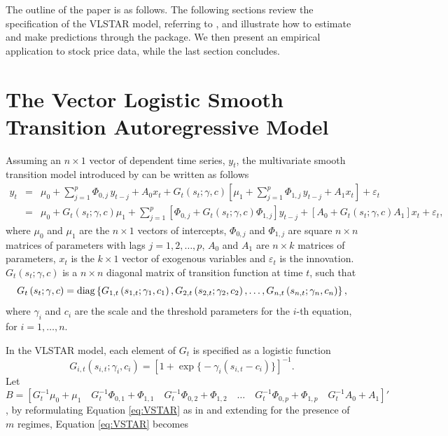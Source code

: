 The outline of the paper is as follows. The following sections review the specification of the VLSTAR model, referring to \citet*{teraya14}, and illustrate how to estimate and make predictions through the  package. We then present an empirical application to stock price data, while the last section concludes.


\section{The Vector Logistic Smooth Transition Autoregressive Model} 
\label{Section2}

Assuming an $n \times 1$ vector of dependent time series, $y_t$, the multivariate smooth transition model introduced by \citet*{teraya14} can be written as follows
\begin{eqnarray}
\label{eq:VSTAR}
y_t & = & \mu_0+\sum_{j=1}^{p}\Phi_{0,j}\,y_{t-j}+A_0 x_t+
G_t\left(s_t;\gamma,c\right)\left[\mu_{1}+\sum_{j=1}^{p}\Phi_{1,j}\,y_{t-j}+A_1x_t\right]+\varepsilon_t\nonumber\\
& = & \mu_{0}+G_t\left(s_t;\gamma,c\right)\mu_{1}+\sum_{j=1}^{p}\left[\Phi_{0,j}+G_t\left(s_t;\gamma,c\right)\Phi_{1,j}\right]y_{t-j}
+\left[A_0+G_t\left(s_t;\gamma,c\right)A_1\right]x_t+\varepsilon_t,
\end{eqnarray}
where $\mu_{0}$ and $\mu_{1}$ are the $n \times 1$ vectors of intercepts, $\Phi_{0,j}$ and $\Phi_{1,j}$ are square
$n\times n$ matrices of parameters with lags $j=1,2,\dots,p$, $A_0$ and $A_1$ are $n\times k$ matrices of parameters,
$x_t$ is the $k \times 1$ vector of exogenous variables and $\varepsilon_t$ is the innovation. $G_t\left(s_t;\gamma,c\right)$ is a $n
\times n$ diagonal matrix of transition function at time $t$, such that
\begin{equation}
G_t\left(s_t;\gamma,c\right)=\mbox{diag}\left\{G_{1,t}\left(s_{1,t};\gamma_{1},c_{1}\right),G_{2,t}\left(s_{2,t};\gamma_{2},c_{2}\right),
	\dots,G_{n,t}\left(s_{n,t};\gamma_{n},c_{n}\right)\right\},
\end{equation}
where $\gamma_i$ and $c_i$ are the scale and the threshold parameters for the $i$-th equation, for $i = 1, \ldots, n$.

In the VLSTAR model, each element of $G_t$ is specified as a logistic function
\begin{equation}
\label{eq:logistic}
G_{i,t}\left(s_{i,t}; \gamma_i, c_i\right) = \left[1 + \exp\big\{-\gamma_i\left(s_{i,t}-c_i\right)\big\}\right]^{-1}.
\end{equation}
Let $B=\left[G_t^{-1}\mu_0+\mu_1\quad G_t^{-1}\Phi_{0,1}+\Phi_{1,1}\quad G_t^{-1}\Phi_{0,2}+\Phi_{1,2}\quad\ldots\quad
G_t^{-1}\Phi_{0,p}+\Phi_{1,p}\quad G_t^{-1}A_0+A_1\right]'$, by reformulating Equation \eqref{eq:VSTAR} as in \cite{teraya14} and extending for the presence of $m$ regimes, Equation \eqref{eq:VSTAR} becomes


